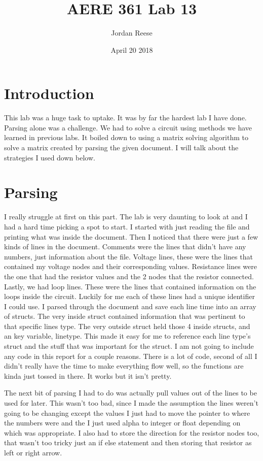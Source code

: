 \documentclass{article}
\title{AERE 361 Lab 13}
\author{Jordan Reese}
\date{April 20 2018}
\begin{document}
\maketitle



\section*{Introduction}

This lab was a huge task to uptake. It was by far the hardest lab I have done. Parsing alone was a challenge. We had to solve a circuit using methods we have learned in previous labs. It boiled down to using a matrix solving algorithm to solve a matrix created by parsing the given document. I will talk about the strategies I used down below.

\section*{Parsing}

I really struggle at first on this part. The lab is very daunting to look at and I had a hard time picking a spot to start. I started with just reading the file and printing what was inside the document. Then I noticed that there were just a few kinds of lines in the document. Comments were the lines that didn't have any numbers, just information about the file. Voltage lines, these were the lines that contained my voltage nodes and their corresponding values. Resistance lines were the one that had the resistor values and the 2 nodes that the resistor connected. Lastly, we had loop lines. These were the lines that contained information on the loops inside the circuit. Luckily for me each of these lines had a unique identifier I could use. I parsed through the document and save each line time into an array of structs. The very inside struct contained information that was pertinent to that specific lines type. The very outside struct held those 4 inside structs, and an key variable, linetype. This made it easy for me to reference each line type's struct and the stuff that was important for the struct. I am not going to include any code in this report for a couple reasons. There is a lot of code, second of all I didn't really have the time to make everything flow well, so the functions are kinda just tossed in there. It works but it isn't pretty. \newline

\indent The next bit of parsing I had to do was actually pull values out of the lines to be used for later. This wasn't too bad, since I made the assumption the lines weren't going to be changing except the values I just had to move the pointer to where the numbers were and the I just used alpha to integer or float depending on which was appropriate. I also had to store the direction for the resistor nodes too, that wasn't too tricky just an if else statement and then storing that resistor as left or right arrow. 
\end{document}

